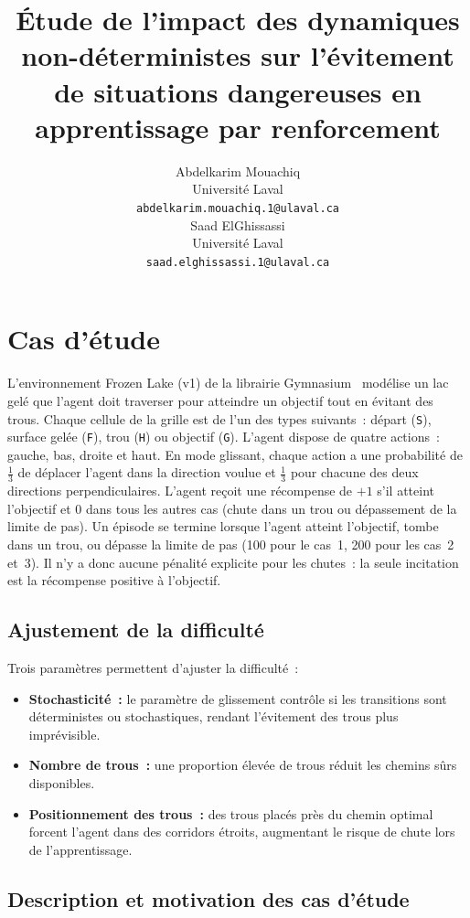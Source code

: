 \documentclass{article}
\title{Étude de l'impact des dynamiques non-déterministes sur l'évitement de situations dangereuses en apprentissage par renforcement}
\author{
  Abdelkarim Mouachiq \\
  Université Laval \\
  \texttt{abdelkarim.mouachiq.1@ulaval.ca} \\
  \And
  Saad ElGhissassi \\
  Université Laval \\
  \texttt{saad.elghissassi.1@ulaval.ca} \\
}
\begin{document}
\maketitle


\section{Cas d'étude}

L'environnement Frozen Lake (v1) de la librairie Gymnasium~\cite{towers2024gymnasium} modélise un lac gelé que l'agent doit traverser pour atteindre un objectif tout en évitant des trous. Chaque cellule de la grille est de l'un des types suivants~: départ (\texttt{S}), surface gelée (\texttt{F}), trou (\texttt{H}) ou objectif (\texttt{G}). L'agent dispose de quatre actions~: gauche, bas, droite et haut. En mode glissant, chaque action a une probabilité de $\frac{1}{3}$ de déplacer l'agent dans la direction voulue et $\frac{1}{3}$ pour chacune des deux directions perpendiculaires. L'agent reçoit une récompense de $+1$ s'il atteint l'objectif et $0$ dans tous les autres cas (chute dans un trou ou dépassement de la limite de pas). Un épisode se termine lorsque l'agent atteint l'objectif, tombe dans un trou, ou dépasse la limite de pas (100 pour le cas~1, 200 pour les cas~2 et~3). Il n'y a donc aucune pénalité explicite pour les chutes~: la seule incitation est la récompense positive à l'objectif.

\subsection{Ajustement de la difficulté}

Trois paramètres permettent d'ajuster la difficulté~:
\begin{itemize}
    \item \textbf{Stochasticité~:} le paramètre de glissement contrôle si les transitions sont déterministes ou stochastiques, rendant l'évitement des trous plus imprévisible.
    \item \textbf{Nombre de trous~:} une proportion élevée de trous réduit les chemins sûrs disponibles.
    \item \textbf{Positionnement des trous~:} des trous placés près du chemin optimal forcent l'agent dans des corridors étroits, augmentant le risque de chute lors de l'apprentissage.
\end{itemize}

\subsection{Description et motivation des cas d'étude}
\end{document}
